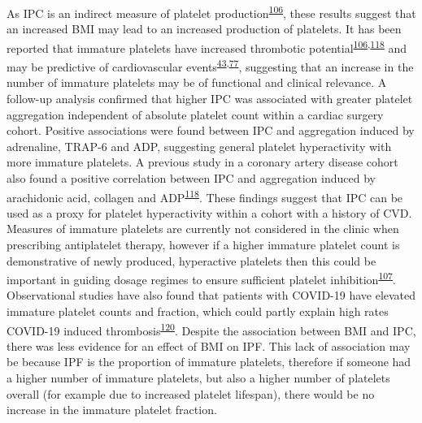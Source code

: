 \documentclass[11pt,twoside]{bristolthesis}
\begin{document}
As IPC is an indirect measure of platelet production\textsuperscript{\protect\hyperlink{ref-Lev2016a}{106}}, these results suggest that an increased BMI may lead to an increased production of platelets. It has been reported that immature platelets have increased thrombotic potential\textsuperscript{\protect\hyperlink{ref-Lev2016a}{106},\protect\hyperlink{ref-Grove2011a}{118}} and may be predictive of cardiovascular events\textsuperscript{\protect\hyperlink{ref-Freynhofer2017a}{43},\protect\hyperlink{ref-Ibrahim2014}{77}}, suggesting that an increase in the number of immature platelets may be of functional and clinical relevance. A follow-up analysis confirmed that higher IPC was associated with greater platelet aggregation independent of absolute platelet count within a cardiac surgery cohort. Positive associations were found between IPC and aggregation induced by adrenaline, TRAP-6 and ADP, suggesting general platelet hyperactivity with more immature platelets. A previous study in a coronary artery disease cohort also found a positive correlation between IPC and aggregation induced by arachidonic acid, collagen and ADP\textsuperscript{\protect\hyperlink{ref-Grove2011a}{118}}. These findings suggest that IPC can be used as a proxy for platelet hyperactivity within a cohort with a history of CVD. Measures of immature platelets are currently not considered in the clinic when prescribing antiplatelet therapy, however if a higher immature platelet count is demonstrative of newly produced, hyperactive platelets then this could be important in guiding dosage regimes to ensure sufficient platelet inhibition\textsuperscript{\protect\hyperlink{ref-Bernlochner2015a}{107}}. Observational studies have also found that patients with COVID-19 have elevated immature platelet counts and fraction, which could partly explain high rates COVID-19 induced thrombosis\textsuperscript{\protect\hyperlink{ref-Klok2020}{120}}. Despite the association between BMI and IPC, there was less evidence for an effect of BMI on IPF. This lack of association may be because IPF is the proportion of immature platelets, therefore if someone had a higher number of immature platelets, but also a higher number of platelets overall (for example due to increased platelet lifespan), there would be no increase in the immature platelet fraction.
\end{document}

